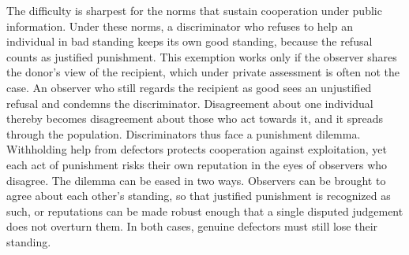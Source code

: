 The difficulty is sharpest for the norms that sustain cooperation under public information. Under these norms, a discriminator who refuses to help an individual in bad standing keeps its own good standing, because the refusal counts as justified punishment\cite{panchanathan2003,ohtsuki2004,okada2020dilemmas}. This exemption works only if the observer shares the donor's view of the recipient, which under private assessment is often not the case. An observer who still regards the recipient as good sees an unjustified refusal and condemns the discriminator. Disagreement about one individual thereby becomes disagreement about those who act towards it, and it spreads through the population\cite{hilbe2018,uchida2013,radzvilavicius2019}. Discriminators thus face a punishment dilemma. Withholding help from defectors protects cooperation against exploitation, yet each act of punishment risks their own reputation in the eyes of observers who disagree\cite{okada2020dilemmas,michelmata2024,pires2025}. The dilemma can be eased in two ways. Observers can be brought to agree about each other's standing, so that justified punishment is recognized as such, or reputations can be made robust enough that a single disputed judgement does not overturn them. In both cases, genuine defectors must still lose their standing.
